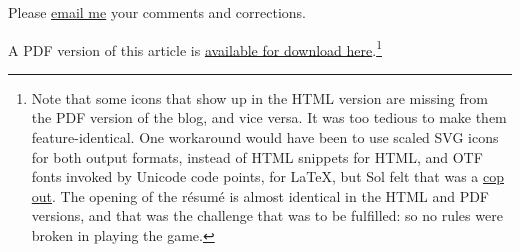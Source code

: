 \documentclass[
  british,
  a4paper,
  rgb,
  dvipsnames,
  svgnames,
  hyphens]{article}
\begin{document}
Please \href{mailto:feedback.swanlotus@gmail.com}{email me} your
comments and corrections.

\noindent A PDF version of this article is
\href{using-font-awesome.pdf}{available for download here}.\footnote{Note
  that some icons that show up in the HTML version are missing from the
  PDF version of the blog, and vice versa. It was too tedious to make
  them feature-identical. One workaround would have been to use scaled
  SVG icons for both output formats, instead of HTML snippets for HTML,
  and OTF fonts invoked by Unicode code points, for LaTeX, but Sol felt
  that was a \href{https://www.thefreedictionary.com/cop+out}{cop out}.
  The opening of the résumé is almost identical in the HTML and PDF
  versions, and that was the challenge that was to be fulfilled: so no
  rules were broken in playing the game.  \normalfont}
\end{document}
